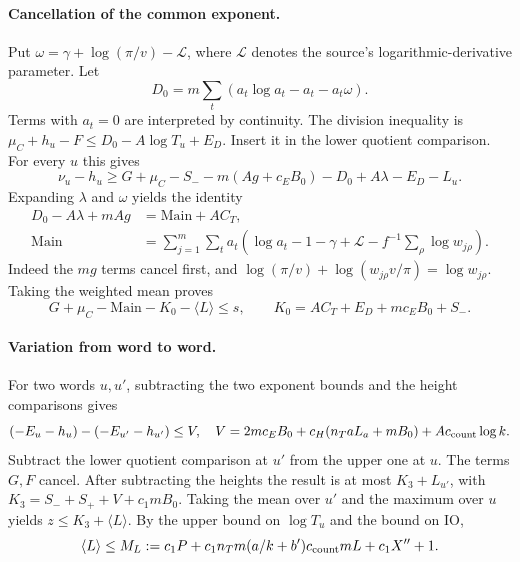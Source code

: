 \paragraph{Cancellation of the common exponent.}
Put \(\omega=\gamma+\log(\pi/v)-\mathcal L\), where
\(\mathcal L\) denotes the source's logarithmic-derivative parameter.
Let
\[
 D_0=m\sum_t(a_t\log a_t-a_t-a_t\omega).
\]
Terms with \(a_t=0\) are interpreted by continuity. The division
inequality is \(\mu_C+h_u-F\le D_0-A\log T_u+E_D\).
Insert it in the lower quotient comparison. For every \(u\) this
gives
\[
 \nu_u-h_u\ge G+\mu_C
          -S_- -m(Ag+c_EB_0)-D_0+A\lambda-E_D-L_u .
\]
Expanding \(\lambda\) and \(\omega\) yields the identity
\begin{align*}
 D_0-A\lambda+mAg
  &=\mathrm{Main}+AC_T,\\
 \mathrm{Main}
  &=\sum_{j=1}^m\sum_t a_t\!
  \left(\log a_t-1-\gamma+\mathcal L
               - f^{-1}\sum_\rho\log w_{j\rho}\right).
\end{align*}
Indeed the \(mg\) terms cancel first, and
\(\log(\pi/v)+\log(w_{j\rho}v/\pi)=\log w_{j\rho}\).
Taking the weighted mean proves
\begin{equation}
  G+\mu_C-\mathrm{Main}-K_0-\langle L\rangle \le s,\qquad
  K_0=AC_T+E_D+mc_EB_0+S_- .
  \label{eq:height-gap-lower}
\end{equation}

\paragraph{Variation from word to word.}
For two words \(u,u'\), subtracting the two exponent bounds and the
height comparisons gives
\[
  (-E_u-h_u)-(-E_{u'}-h_{u'})\le V,\quad
  V=2mc_EB_0+c_H(n_TaL_a+mB_0)+Ac_{\rm count}\log k.
\]
Subtract the lower quotient comparison at \(u'\) from the upper
one at \(u\). The terms \(G,F\) cancel. After subtracting the heights
the result is at most \(K_3+L_{u'}\), with
\(K_3=S_-+S_++V+c_1mB_0\). Taking the mean over \(u'\) and the
maximum over \(u\) yields \(z\le K_3+\langle L\rangle\). By the
upper bound on \(\log T_u\) and the bound on \(\mathrm{IO}\),
\[
 \langle L\rangle\le M_L
    :=c_1P+c_1 n_Tm(a/k+b')c_{\rm count}mL+c_1X''+1 .
\]

